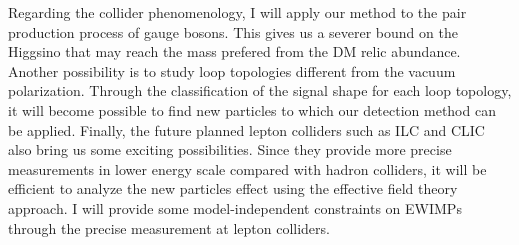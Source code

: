 \documentclass[12pt,notitlepage]{book}
\begin{document}
Regarding the collider phenomenology, I will apply our method to the
pair production process of gauge bosons.  This gives us a severer bound
on the Higgsino that may reach the mass prefered from the DM relic
abundance.  Another possibility is to study loop topologies different
from the vacuum polarization.  Through the classification of the signal
shape for each loop topology, it will become possible to find new
particles to which our detection method can be applied.  Finally, the
future planned lepton colliders such as ILC and CLIC also bring us some
exciting possibilities.  Since they provide more precise measurements in
lower energy scale compared with hadron colliders, it will be efficient
to analyze the new particles effect using the effective field theory
approach.  I will provide some model-independent constraints on EWIMPs
through the precise measurement at lepton colliders.
\end{document}

